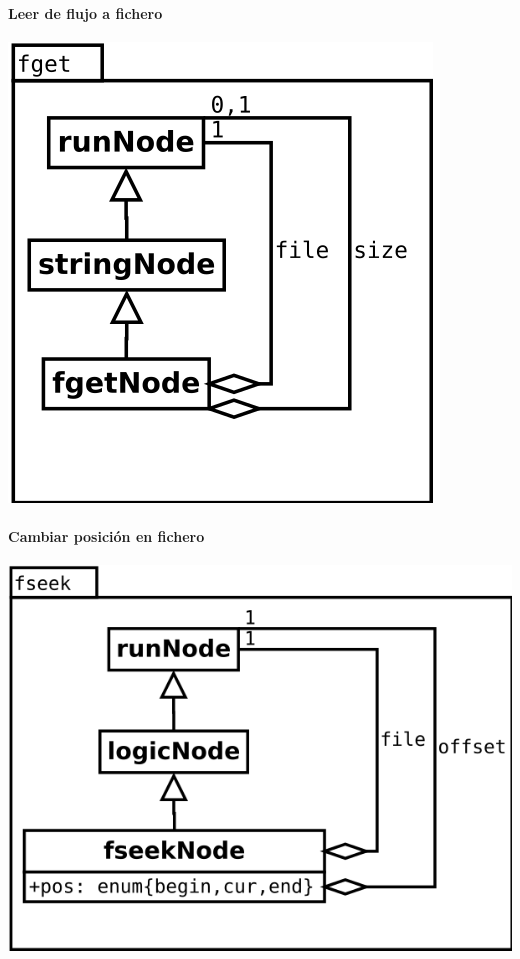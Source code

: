 \begin{multicols}{2}
   \paragraph {Leer de flujo a fichero} 
   \begin{center}
   \includegraphics[scale=0.4]{fget.png} \\
   \end{center}

   \paragraph {Cambiar posición en fichero} 
   \begin{center}
   \includegraphics[scale=0.4]{fseek.png} \\
   \end{center}
\columnbreak

\end{multicols}

